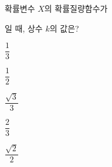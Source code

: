 확률변수 $X$의 확률질량함수가 \par\smallskip{}\par\smallskip\noindent 일 때, 상수 $k$의 값은?
\begin{choices32}{\rule[-3ex]{0pt}{8ex}$\dfrac{1}{3}$}{\rule[-3ex]{0pt}{8ex}$\dfrac{1}{2}$}{\rule[-3ex]{0pt}{8ex}$\dfrac{\sqrt{3}}{3}$}{\rule[-3ex]{0pt}{8ex}$\dfrac{2}{3}$}{\rule[-3ex]{0pt}{8ex}$\dfrac{\sqrt{2}}{2}$}\end{choices32}
